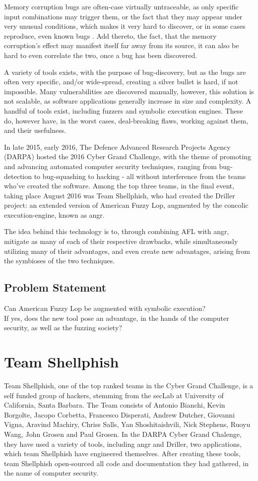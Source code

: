 \documentclass[a4paper]{article}
\begin{document}
Memory corruption bugs are often-case virtually untraceable, as only specific input combinations may trigger them, or the fact that they may appear under very unusual conditions, which makes it very hard to discover, or in some cases reproduce, even known bugs . Add thereto, the fact, that the memory corruption's effect may manifest itself far away from its source, it can also be hard to even correlate the two, once a bug has been discovered.

A variety of tools exists, with the purpose of bug-discovery, but as the bugs are often very specific, and/or wide-spread, creating a silver bullet is hard, if not impossible. Many vulnerabilities are discovered manually, however, this solution is not scalable, as software applications generally increase in size and complexity. A handful of tools exist, including fuzzers and symbolic execution engines. These do, however have, in the worst cases, deal-breaking flaws, working against them, and their usefulness.

In late 2015, early 2016, The Defence Advanced Research Projects Agency (DARPA) hosted the 2016 Cyber Grand Challenge, with the theme of promoting and advancing automated computer security techniques, ranging from bug-detection to bug-squashing to hacking - all without interference from the teams who've created the software. Among the top three teams, in the final event, taking place August 2016 was Team Shellphish, who had created the Driller project: an extended version of American Fuzzy Lop, augmented by the concolic execution-engine, known as angr.

The idea behind this technology is to, through combining AFL with angr, mitigate as many of each of their respective drawbacks, while simultaneously utilizing many of their advantages, and even create new advantages, arising from the symbioses of the two techniques.
\subsection{Problem Statement}
\label{sec:Problem}
Can American Fuzzy Lop be augmented with symbolic execution?\\[0.1cm]
If yes, does the new tool pose an advantage, in the hands of the computer security, as well as the fuzzing society?
\newpage
\section{Team Shellphish}
\label{sec:Shellphish}
Team Shellphish, one of the top ranked teams in the Cyber Grand Challenge, is a self funded group of hackers, stemming from the secLab at University of California, Santa Barbara. The Team consists of Antonio Bianchi, Kevin Borgolte, Jacopo Corbetta, Francesco Disperati, Andrew Dutcher, Giovanni Vigna, Aravind Machiry, Chriss Salls, Yan Shoshitaishvili, Nick Stephens, Ruoyu Wang, John Grosen and Paul Grosen. In the DARPA Cyber Grand Chalenge, they have used a variety of tools, including angr and Driller, two applications, which team Shellphish have engineered themselves. After creating these tools, team Shellphish open-sourced all code and documentation they had gathered, in the name of computer security.
\end{document}
